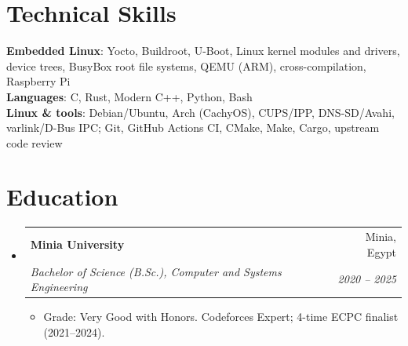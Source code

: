 \documentclass[letterpaper,11pt]{article}
\makeatletter
\newcommand{\resumeItem}[1]{
  \item\small{
    {#1 \vspace{-2pt}}
  }
}
\newcommand{\resumeSubheading}[4]{
  \vspace{-2pt}\item
    \begin{tabular*}{0.97\textwidth}[t]{l@{\extracolsep{\fill}}r}
      \textbf{#1} & #2 \\
      \textit{\small#3} & \textit{\small #4} \\
    \end{tabular*}\vspace{-7pt}
}
\newcommand{\resumeSubHeadingListStart}{\begin{itemize}[leftmargin=0.15in, label={}]}
\newcommand{\resumeSubHeadingListEnd}{\end{itemize}}
\newcommand{\resumeItemListStart}{\begin{itemize}}
\newcommand{\resumeItemListEnd}{\end{itemize}\vspace{-5pt}}
\makeatother
\begin{document}
%
\section{Technical Skills}
 \begin{itemize}[leftmargin=0.15in, label={}]
    \small{\item{
     \textbf{Embedded Linux}{: Yocto, Buildroot, U-Boot, Linux kernel modules and drivers, device trees, BusyBox root file systems, QEMU (ARM), cross-compilation, Raspberry Pi} \\
     \textbf{Languages}{: C, Rust, Modern C++, Python, Bash} \\
     \textbf{Linux \& tools}{: Debian/Ubuntu, Arch (CachyOS), CUPS/IPP, DNS-SD/Avahi, varlink/D-Bus IPC; Git, GitHub Actions CI, CMake, Make, Cargo, upstream code review}
    }}
 \end{itemize}

\section{Education}
  \resumeSubHeadingListStart
    \resumeSubheading
      {Minia University}{Minia, Egypt}
      {Bachelor of Science (B.Sc.), Computer and Systems Engineering}{2020 -- 2025}
      \resumeItemListStart
        \resumeItem{Grade: Very Good with Honors. Codeforces Expert; 4-time ECPC finalist (2021--2024).}
      \resumeItemListEnd
  \resumeSubHeadingListEnd


\end{document}
